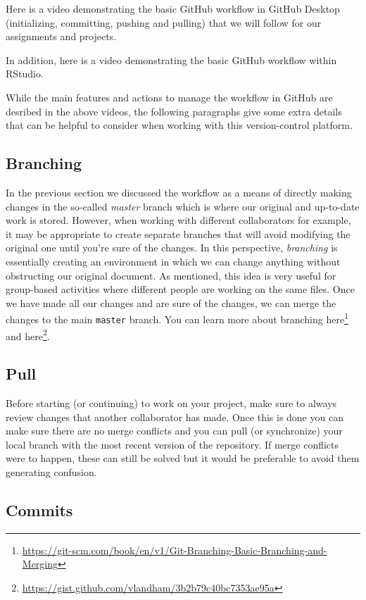 \documentclass[12pt,]{krantz}
\renewcommand{\href}[2]{#2\footnote{\url{#1}}}
\begin{document}
Here is a video demonstrating the basic GitHub workflow in GitHub
Desktop (initializing, committing, pushing and pulling) that we will
follow for our assignments and projects.

In addition, here is a video demonstrating the basic GitHub workflow
within RStudio.

While the main features and actions to manage the workflow in GitHub are
desribed in the above videos, the following paragraphs give some extra
details that can be helpful to consider when working with this
version-control platform.

\subsection{Branching}\label{branching}

In the previous section we discussed the workflow as a means of directly
making changes in the so-called \emph{master} branch which is where our
original and up-to-date work is stored. However, when working with
different collaborators for example, it may be appropriate to create
separate branches that will avoid modifying the original one until
you're sure of the changes. In this perspective, \emph{branching} is
essentially creating an environment in which we can change anything
without obstructing our original document. As mentioned, this idea is
very useful for group-based activities where different people are
working on the same files. Once we have made all our changes and are
sure of the changes, we can merge the changes to the main
\texttt{master} branch. You can learn more about branching
\href{https://git-scm.com/book/en/v1/Git-Branching-Basic-Branching-and-Merging}{here}
and \href{https://gist.github.com/vlandham/3b2b79c40bc7353ae95a}{here}.

\subsection{Pull}\label{pull}

Before starting (or continuing) to work on your project, make sure to
always review changes that another collaborator has made. Once this is
done you can make sure there are no merge conflicts and you can pull (or
synchronize) your local branch with the most recent version of the
repository. If merge conflicts were to happen, these can still be solved
but it would be preferable to avoid them generating confusion.

\subsection{Commits}\label{commits}
\end{document}
